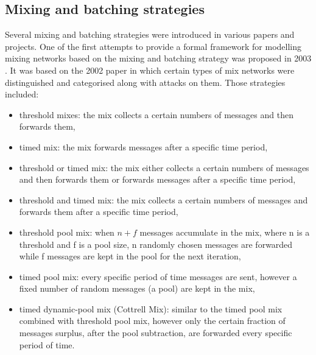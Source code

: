 \subsection{Mixing and batching strategies}
Several mixing and batching strategies were introduced in various papers and projects. One of the first attempts to provide a formal framework for modelling mixing networks based on the mixing and batching strategy was proposed in 2003 \cite{generalising}. It was based on the 2002 paper \cite{mix-attacks} in which certain types of mix networks were distinguished and categorised along with attacks on them. Those strategies included:
\begin{itemize}
    \item threshold mixes: the mix collects a certain numbers of messages and then forwards them, 
    \item timed mix: the mix forwards messages after a specific time period,
    \item threshold or timed mix: the mix either collects a certain numbers of messages and then forwards them or forwards messages after a specific time period,
    \item threshold and timed mix: the mix collects a certain numbers of messages and forwards them after a specific time period,
    \item threshold pool mix: when $n+f$ messages accumulate in the mix, where n is a threshold and f is a pool size, n randomly chosen messages are forwarded while f messages are kept in the pool for the next iteration,
    \item timed pool mix: every specific period of time messages are sent, however a fixed number of random messages (a pool) are kept in the mix,
    \item timed dynamic-pool mix (Cottrell Mix): similar to the timed pool mix combined with threshold pool mix, however only the certain fraction of messages surplus, after the pool subtraction, are forwarded every specific period of time.
\end{itemize}

